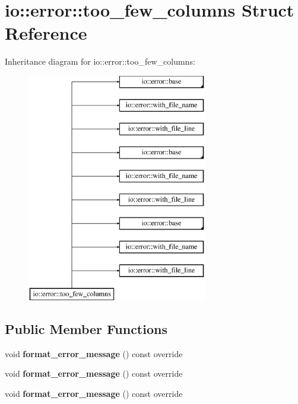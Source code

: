 \hypertarget{structio_1_1error_1_1too__few__columns}{}\section{io\+:\+:error\+:\+:too\+\_\+few\+\_\+columns Struct Reference}
\label{structio_1_1error_1_1too__few__columns}
Inheritance diagram for io\+:\+:error\+:\+:too\+\_\+few\+\_\+columns\+:\begin{figure}[H]
\begin{center}
\leavevmode
\includegraphics[height=10.000000cm]{d4/ddb/structio_1_1error_1_1too__few__columns}
\end{center}
\end{figure}
\subsection*{Public Member Functions}
\begin{DoxyCompactItemize}
\item 
\mbox{\label{structio_1_1error_1_1too__few__columns_a71e5735dd9994d4eabfc0bcbc49fef90}} 
void {\bfseries format\+\_\+error\+\_\+message} () const override
\item 
\mbox{\label{structio_1_1error_1_1too__few__columns_a71e5735dd9994d4eabfc0bcbc49fef90}} 
void {\bfseries format\+\_\+error\+\_\+message} () const override
\item 
\mbox{\label{structio_1_1error_1_1too__few__columns_a71e5735dd9994d4eabfc0bcbc49fef90}} 
void {\bfseries format\+\_\+error\+\_\+message} () const override
\end{DoxyCompactItemize}
